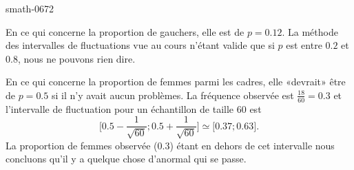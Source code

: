 
\begin{corrige}{smath-0672}

    En ce qui concerne la proportion de gauchers, elle est de \( p=0.12\). La méthode des intervalles de fluctuations vue au cours n'étant valide que si \( p\) est entre \( 0.2\) et \( 0.8\), nous ne pouvons rien dire.

    En ce qui concerne la proportion de femmes parmi les cadres, elle «devrait» être de \( p=0.5\) si il n'y avait aucun problèmes. La fréquence observée est \( \frac{ 18 }{ 60 }=0.3 \) et l'intervalle de fluctuation pour un échantillon de taille \( 60\) est
    \begin{equation}
        \mathopen[ 0.5-\frac{1}{ \sqrt{60} } ; 0.5+\frac{1}{ \sqrt{60} } \mathclose]\simeq\mathopen[ 0.37 ; 0.63 \mathclose].
    \end{equation}
    La proportion de femmes observée (\( 0.3\)) étant en dehors de cet intervalle nous concluons qu'il y a quelque chose d'anormal qui se passe.

\end{corrige}
